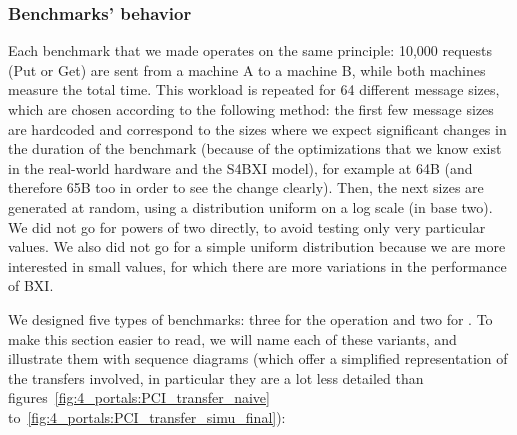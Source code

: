 \subsubsection{Benchmarks' behavior}

Each benchmark that we made operates on the same principle: 10,000 requests (Put
or Get) are sent from a machine A to a machine B, while both machines measure
the total time. This workload is repeated for 64 different message sizes,
which are chosen according to the following method: the first few message sizes
are hardcoded and correspond to the sizes where we expect significant changes in
the duration of the benchmark (because of the optimizations that we know exist
in the real-world hardware and the S4BXI model), for example at 64B (and
therefore 65B too in order to see the change clearly). Then, the next sizes are
generated at random, using a distribution uniform on a log scale (in base two).
We did not go for powers of two directly, to avoid testing only very particular
values. We also did not go for a simple uniform distribution because we are more
interested in small values, for which there are more variations in the
performance of BXI.

We designed five types of benchmarks: three for the  operation
and two for . To make this section easier to read, we will name
each of these variants, and illustrate them with sequence diagrams (which offer
a simplified representation of the transfers involved, in particular they are a
lot less detailed than figures~\ref{fig:4_portals:PCI_transfer_naive}
to~\ref{fig:4_portals:PCI_transfer_simu_final}):

